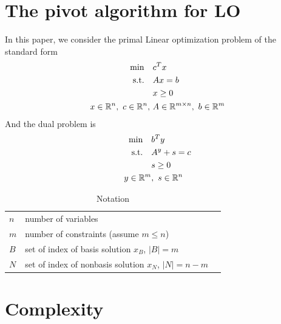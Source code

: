 \documentclass[11pt]{article}
\begin{document}
\section{The pivot algorithm for LO}
In this paper, we consider the primal Linear optimization problem of the standard form
\begin{align}
\begin{split}
\min \quad &c^Tx\\
\text{s.t.} \quad &Ax = b\\
&x \ge 0\\
 x \in \mathbb{R}^n,\ c \in \mathbb{R}^n,\ &A \in \mathbb{R}^{m\times n},\ b \in \mathbb{R}^m   
\end{split} \label{LOprimal}
\end{align}
And the dual problem is 
\begin{align}
\begin{split}
\min \quad &b^Ty\\
\text{s.t.} \quad &A^y + s = c\\
&s \ge 0\\
 y \in \mathbb{R}^m&,\ s \in \mathbb{R}^n   
\end{split} \label{LOdual}
\end{align}
\begin{table}[h]
\caption{Notation}
\centering
\begin{tabular}{lll}
\hline
$n$ & number of variables   &  \\
$m$ & number of constraints (assume $m \le n$) &  \\
$B$ & set of index of basis solution $x_B$, $|B| = m$&  \\
$N$ & set of index of nonbasis solution $x_N$, $|N| = n-m$&  \\
\hline
\end{tabular}
\end{table}
\section{Complexity}
\end{document}
